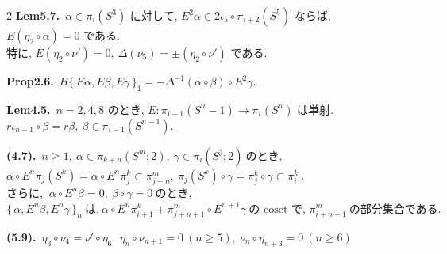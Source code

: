 \documentclass[10pt, leqno]{ltjsarticle}
\newcommand{\todai}[2][]{\{\,#2\,\}_{#1}}      %
\newcommand{\pis}[2]{\pi_{#1}(#2)}       %
\newcommand{\pit}[2]{\pi_{#1}^{#2}}
\numberwithin{equation}{section}
\theoremstyle{plain}
\theoremstyle{definition}
\theoremstyle{remark}
\begin{document}
\begin{paracol}{2}
\noindent
\textbf{Lem5.7.}\
\(\alpha\in\pi_i(S^3)\) に対して,
\(E^2\alpha\in2\iota_5\circ\pi_{i+2}(S^5)\) ならば, 
\(E(\eta_2\circ\alpha)=0\) である. \\
特に, \(E(\eta_2\circ\nu')=0, \ \Delta(\nu_5)=\pm(\eta_2\circ\nu')\) である. 

\noindent
\textbf{Prop2.6.}\
\(H\todai[1]{E\alpha, E\beta, E\gamma} 
= -\Delta^{-1}(\alpha\circ\beta)\circ E^2\gamma.\)

\noindent
\textbf{Lem4.5.}\
\(n=2,4,8\) のとき, 
\(E:\pis{i-1}{S^n-1}\to\pis{i}{S^n}\) は単射.\\ 
\(r\iota_{n-1}\circ\beta = r\beta,\ \beta\in\pis{i-1}{S^{n-1}}\).

\noindent
\textbf{(4.7).}\
\(n\ge1, \ \alpha\in\pis{k+n}{S^m; 2},\ \gamma\in\pis{i}{S^j; 2}
    \ \text{のとき, }\)\\
\(\alpha\circ E^n\pis{j}{S^k} = \alpha\circ E^n \pit{j}{k}
  \subset \pit{j+n}{m},
  \ \pis{j}{S^k}\circ\gamma = \pit{j}{k}\circ\gamma \subset\pit{i}{k}\ . \)\\
\(\text{さらに, }\ \alpha\circ E^n\beta=0,\ \beta\circ\gamma = 0 \ \text{のとき, }\)\\
\(\todai[n]{\alpha, E^n\beta, E^n\gamma}\ \text{は,}\
  \alpha\circ E^n\pit{i+1}{k} + \pit{j+n+1}{m}\circ E^{n+1}\gamma\
  \text{の coset で, }\pit{i+n+1}{m} \ \text{の部分集合である. }\)

\noindent
\textbf{(5.9).}\
\(\eta_3\circ \nu_4= \nu'\circ \eta_6,\
\eta_n\circ \nu_{n+1}=0\ (n\ge5),\
\nu_n\circ \eta_{n+3}=0\ (n\ge6)\)






\end{paracol}
\end{document}
